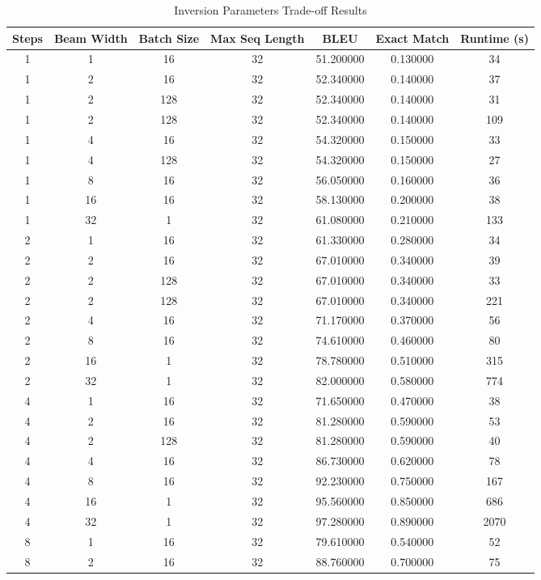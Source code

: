 \begin{table}
\caption{Inversion Parameters Trade-off Results}
\label{tab:trade_off_table}
\begin{tabular}{ccccccc}
\toprule
Steps & Beam Width & Batch Size & Max Seq Length & BLEU & Exact Match & Runtime (s) \\
\midrule
1 & 1 & 16 & 32 & 51.200000 & 0.130000 & 34 \\
1 & 2 & 16 & 32 & 52.340000 & 0.140000 & 37 \\
1 & 2 & 128 & 32 & 52.340000 & 0.140000 & 31 \\
1 & 2 & 128 & 32 & 52.340000 & 0.140000 & 109 \\
1 & 4 & 16 & 32 & 54.320000 & 0.150000 & 33 \\
1 & 4 & 128 & 32 & 54.320000 & 0.150000 & 27 \\
1 & 8 & 16 & 32 & 56.050000 & 0.160000 & 36 \\
1 & 16 & 16 & 32 & 58.130000 & 0.200000 & 38 \\
1 & 32 & 1 & 32 & 61.080000 & 0.210000 & 133 \\
2 & 1 & 16 & 32 & 61.330000 & 0.280000 & 34 \\
2 & 2 & 16 & 32 & 67.010000 & 0.340000 & 39 \\
2 & 2 & 128 & 32 & 67.010000 & 0.340000 & 33 \\
2 & 2 & 128 & 32 & 67.010000 & 0.340000 & 221 \\
2 & 4 & 16 & 32 & 71.170000 & 0.370000 & 56 \\
2 & 8 & 16 & 32 & 74.610000 & 0.460000 & 80 \\
2 & 16 & 1 & 32 & 78.780000 & 0.510000 & 315 \\
2 & 32 & 1 & 32 & 82.000000 & 0.580000 & 774 \\
4 & 1 & 16 & 32 & 71.650000 & 0.470000 & 38 \\
4 & 2 & 16 & 32 & 81.280000 & 0.590000 & 53 \\
4 & 2 & 128 & 32 & 81.280000 & 0.590000 & 40 \\
4 & 4 & 16 & 32 & 86.730000 & 0.620000 & 78 \\
4 & 8 & 16 & 32 & 92.230000 & 0.750000 & 167 \\
4 & 16 & 1 & 32 & 95.560000 & 0.850000 & 686 \\
4 & 32 & 1 & 32 & 97.280000 & 0.890000 & 2070 \\
8 & 1 & 16 & 32 & 79.610000 & 0.540000 & 52 \\
8 & 2 & 16 & 32 & 88.760000 & 0.700000 & 75 \\

\end{tabular}
\end{table}
